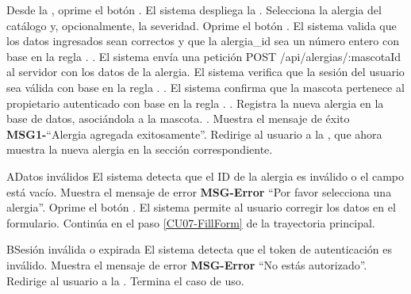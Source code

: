   \begin{UCtrayectoria}
      \UCpaso[\UCactor] Desde la , oprime el botón .
      \UCpaso El sistema despliega la .
      \UCpaso[\UCactor] Selecciona la alergia del catálogo y, opcionalmente, la severidad. \label{CU07-FillForm}
      \UCpaso[\UCactor] Oprime el botón . \label{CU07-Submit}
      \UCpaso El sistema valida que los datos ingresados sean correctos y que la alergia\_id sea un número entero con base en la regla . .
      \UCpaso El sistema envía una petición POST /api/alergias/:mascotaId al servidor con los datos de la alergia.
      \UCpaso El sistema verifica que la sesión del usuario sea válida con base en la regla . .
      \UCpaso El sistema confirma que la mascota pertenece al propietario autenticado con base en la regla . .
      \UCpaso Registra la nueva alergia en la base de datos, asociándola a la mascota. .
      \UCpaso Muestra el mensaje de éxito {\bf MSG1-}``Alergia agregada exitosamente''.
      \UCpaso Redirige al usuario a la , que ahora muestra la nueva alergia en la sección correspondiente.
  \end{UCtrayectoria}
  
  
  \begin{UCtrayectoriaA}{A}{Datos inválidos}
      \UCpaso El sistema detecta que el ID de la alergia es inválido o el campo está vacío.
      \UCpaso Muestra el mensaje de error {\bf MSG-Error} ``Por favor selecciona una alergia''.
      \UCpaso[\UCactor] Oprime el botón .
      \UCpaso[] El sistema permite al usuario corregir los datos en el formulario.
      \UCpaso Continúa en el paso \ref{CU07-FillForm} de la trayectoria principal.
  \end{UCtrayectoriaA}
  
  \begin{UCtrayectoriaA}{B}{Sesión inválida o expirada}
      \UCpaso El sistema detecta que el token de autenticación es inválido.
      \UCpaso Muestra el mensaje de error {\bf MSG-Error} ``No estás autorizado''.
      \UCpaso[] Redirige al usuario a la .
      \UCpaso[] Termina el caso de uso.
  \end{UCtrayectoriaA}
  
